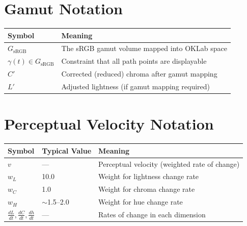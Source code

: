 \section{Gamut Notation}
\label{sec:notation-gamut}

\begin{center}
\begin{tabular}{ll}
  \toprule
  \textbf{Symbol} & \textbf{Meaning} \\
  \midrule
  $G_{\text{sRGB}}$ & The sRGB gamut volume mapped into OKLab space \\
  $\gamma(t) \in G_{\text{sRGB}}$ & Constraint that all path points are displayable \\
  $C'$ & Corrected (reduced) chroma after gamut mapping \\
  $L'$ & Adjusted lightness (if gamut mapping required) \\
  \bottomrule
\end{tabular}
\end{center}

\section{Perceptual Velocity Notation}
\label{sec:notation-velocity}

\begin{center}
\begin{tabular}{lll}
  \toprule
  \textbf{Symbol} & \textbf{Typical Value} & \textbf{Meaning} \\
  \midrule
  $v$ & --- & Perceptual velocity (weighted rate of change) \\
  $w_L$ & 10.0 & Weight for lightness change rate \\
  $w_C$ & 1.0 & Weight for chroma change rate \\
  $w_H$ & $\sim$1.5--2.0 & Weight for hue change rate \\
  $\frac{dL}{dt}, \frac{dC}{dt}, \frac{dh}{dt}$ & --- & Rates of change in each dimension \\
  \bottomrule
\end{tabular}
\end{center}
